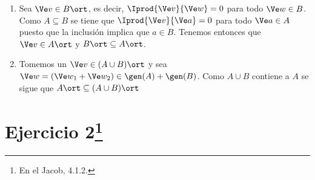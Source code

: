 \begin{sol}
\begin{enumerate}
			\item Sea $\Ve v\in B\ort$, es decir, $\Iprod{\Ve v}{\Ve w} = 0$ para todo $\Ve w\in B$. Como $A\subseteq B$ se tiene que $\Iprod{\Ve v}{\Ve a} = 0$ para todo $\Ve a\in A$ puesto que la inclusión implica que $a\in B$. Tenemos entonces que $\Ve v\in A\ort$ y $B\ort\subseteq A\ort$.
			
			\item Tomemos un $\Ve v\in(A\cup B)\ort$ y sea $\Ve w=(\Ve w_1+\Ve w_2)\in\gen(A)+\gen(B)$. Como $A\cup B$ contiene a $A$ se sigue que $A\ort\subseteq(A\cup B)\ort$
		\end{enumerate}
	\end{sol}

\section*{Ejercicio 2\footnote{En el Jacob, 4.1.2.}}

